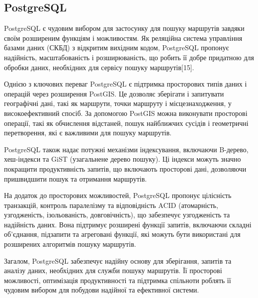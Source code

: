 \subsection{PostgreSQL}
\label{subsec:postgresql-subsection}

PostgreSQL є чудовим вибором для застосунку для пошуку маршрутів завдяки своїм розширеним функціям і можливостям. Як реляційна система управління базами даних (СКБД) з відкритим вихідним кодом, PostgreSQL пропонує надійність, масштабованість і розширюваність, що робить її добре придатною для обробки даних, необхідних для сервісу пошуку маршрутів[15].

Однією з ключових переваг PostgreSQL є підтримка просторових типів даних і операцій через розширення PostGIS. Це дозволяє зберігати і запитувати географічні дані, такі як маршрути, точки маршруту і місцезнаходження, у високоефективний спосіб. За допомогою PostGIS можна виконувати просторові операції, такі як обчислення відстаней, пошук найближчих сусідів і геометричні перетворення, які є важливими для пошуку маршрутів.

PostgreSQL також надає потужні механізми індексування, включаючи B-дерево, хеш-індекси та GiST (узагальнене дерево пошуку). Ці індекси можуть значно покращити продуктивність запитів, що включають просторові дані, дозволяючи пришвидшити пошук та отримання маршрутів.

На додаток до просторових можливостей, PostgreSQL пропонує цілісність транзакцій, контроль паралелізму та відповідність ACID (атомарність, узгодженість, ізольованість, довговічність), що забезпечує узгодженість та надійність даних. Вона підтримує розширені функції запитів, включаючи складні об'єднання, підзапити та агреговані функції, які можуть бути використані для розширених алгоритмів пошуку маршрутів.

Загалом, PostgreSQL забезпечує надійну основу для зберігання, запитів та аналізу даних, необхідних для служби пошуку маршрутів. Її просторові можливості, оптимізація продуктивності та підтримка спільноти роблять її чудовим вибором для побудови надійної та ефективної системи.